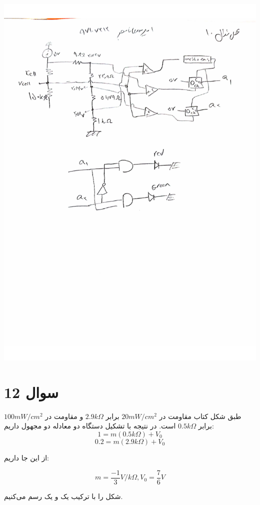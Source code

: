 \documentclass[12pt]{article}
\begin{document}
\begin{center}
	\includegraphics[width = 1.0 \textwidth]{images/10.pdf}
\end{center}
\newpage
\section*{سوال 12}

طبق شکل کتاب مقاومت در $20mW/cm^2$ برابر $2.9k\Omega$ و مقاومت در
$100mW/cm^2$
برابر
$0.5k\Omega$
است. در نتیجه با تشکیل دستگاه دو معادله دو مجهول داریم:
$$1 = m(0.5k\Omega) + V_0$$
$$0.2 = m (2.9 k\Omega) + V_0$$

از این جا داریم:

$$m =\frac{-1}{3} V/k\Omega , V_0 = \frac{7}{6} V$$

شکل را با ترکیب یک  و یک  رسم می‌کنیم.
\end{document}
